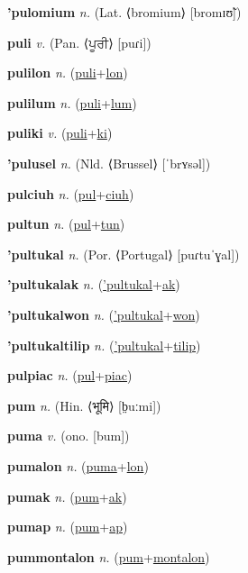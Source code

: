 \textbf{\hypertarget{'pulomium}{'pulomium}} \textit{n.} (Lat. ⟨bromium⟩ [bromɪʊ̃])


\textbf{\hypertarget{puli}{puli}} \textit{v.} (Pan. ⟨{\gurmukhi{}ਪੂਰੀ}⟩ [puɾi])


\textbf{\hypertarget{pulilon}{pulilon}} \textit{n.} (\hyperlink{puli}{puli}+\allowbreak \hyperlink{lon}{lon})


\textbf{\hypertarget{pulilum}{pulilum}} \textit{n.} (\hyperlink{puli}{puli}+\allowbreak \hyperlink{lum}{lum})


\textbf{\hypertarget{puliki}{puliki}} \textit{v.} (\hyperlink{puli}{puli}+\allowbreak \hyperlink{ki}{ki})


\textbf{\hypertarget{'pulusel}{'pulusel}} \textit{n.} (Nld. ⟨Brussel⟩ [ˈbrʏsəl])


\textbf{\hypertarget{pulciuh}{pulciuh}} \textit{n.} (\hyperlink{pul}{pul}+\allowbreak \hyperlink{ciuh}{ciuh})


\textbf{\hypertarget{pultun}{pultun}} \textit{n.} (\hyperlink{pul}{pul}+\allowbreak \hyperlink{tun}{tun})


\textbf{\hypertarget{'pultukal}{'pultukal}} \textit{n.} (Por. ⟨Portugal⟩ [puɾtuˈɣal])


\textbf{\hypertarget{'pultukalak}{'pultukalak}} \textit{n.} (\hyperlink{'pultukal}{'pultukal}+\allowbreak \hyperlink{ak}{ak})


\textbf{\hypertarget{'pultukalwon}{'pultukalwon}} \textit{n.} (\hyperlink{'pultukal}{'pultukal}+\allowbreak \hyperlink{won}{won})


\textbf{\hypertarget{'pultukaltilip}{'pultukaltilip}} \textit{n.} (\hyperlink{'pultukal}{'pultukal}+\allowbreak \hyperlink{tilip}{tilip})


\textbf{\hypertarget{pulpiac}{pulpiac}} \textit{n.} (\hyperlink{pul}{pul}+\allowbreak \hyperlink{piac}{piac})


\textbf{\hypertarget{pum}{pum}} \textit{n.} (Hin. ⟨{\devanagari{}भूमि}⟩ [b̤uːmi])


\textbf{\hypertarget{puma}{puma}} \textit{v.} (ono. [bum])


\textbf{\hypertarget{pumalon}{pumalon}} \textit{n.} (\hyperlink{puma}{puma}+\allowbreak \hyperlink{lon}{lon})


\textbf{\hypertarget{pumak}{pumak}} \textit{n.} (\hyperlink{pum}{pum}+\allowbreak \hyperlink{ak}{ak})


\textbf{\hypertarget{pumap}{pumap}} \textit{n.} (\hyperlink{pum}{pum}+\allowbreak \hyperlink{ap}{ap})


\textbf{\hypertarget{pummontalon}{pummontalon}} \textit{n.} (\hyperlink{pum}{pum}+\allowbreak \hyperlink{montalon}{montalon})


